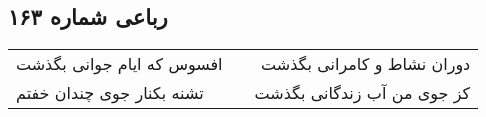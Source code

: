 \begin{center}
\section*{رباعی شماره ۱۶۳}
\label{sec:sh163}
\begin{longtable}{l p{0.5cm} r}
افسوس که ایام جوانی بگذشت
&&
دوران نشاط و کامرانی بگذشت
\\
تشنه بکنار جوی چندان خفتم
&&
کز جوی من آب زندگانی بگذشت
\\
\end{longtable}
\end{center}
